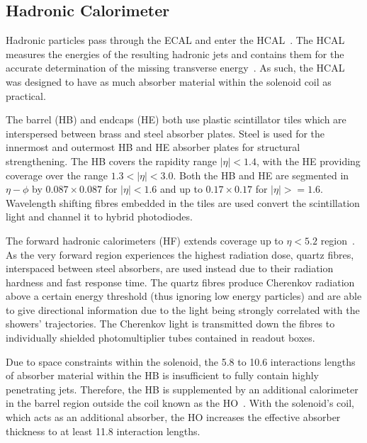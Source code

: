 
\subsection{Hadronic Calorimeter}\label{subsec:HCAL}
Hadronic particles pass through the ECAL and enter the HCAL~\cite{HCAL:tdr}.
The HCAL measures the energies of the resulting hadronic jets and contains them for the accurate determination of the missing transverse energy~\cite{HCAL:tdr}.
As such, the HCAL was designed to have as much absorber material within the solenoid coil as practical. 

The barrel (HB) and endcaps (HE) both use plastic scintillator tiles which are interspersed between brass and steel absorber plates.
Steel is used for the innermost and outermost HB and HE absorber plates for structural strengthening.
The HB covers the rapidity range $|\eta| < 1.4$, with the HE providing coverage over the range $1.3 < |\eta| < 3.0$.
Both the HB and HE are segmented in $\eta - \phi$ by $0.087 \times 0.087$ for $| \eta | < 1.6$ and up to $0.17 \times 0.17$ for $| \eta | >= 1.6$.
Wavelength shifting fibres embedded in the tiles are used convert the scintillation light and channel it to hybrid photodiodes.

The forward hadronic calorimeters (HF) extends coverage up to $\eta < 5.2$ region~\cite{HF}.
As the very forward region experiences the highest radiation dose, quartz fibres, interspaced between steel absorbers, are used instead due to their radiation hardness and fast response time.
The quartz fibres produce Cherenkov radiation above a certain energy threshold (thus ignoring low energy particles) and are able to give directional information due to the light being strongly correlated with the showers' trajectories.
The Cherenkov light is transmitted down the fibres to individually shielded photomultiplier tubes contained in readout boxes.

Due to space constraints within the solenoid, the 5.8 to 10.6 interactions lengths of absorber material within the HB is insufficient to fully contain highly penetrating jets.
Therefore, the HB is supplemented by an additional calorimeter in the barrel region outside the coil known as the HO~\cite{HO}.
With the solenoid's coil, which acts as an additional absorber, the HO increases the effective absorber thickness to at least 11.8 interaction lengths.

